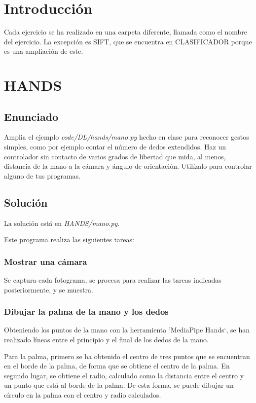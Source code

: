 \documentclass[12pt]{article}
\begin{document}

\tableofcontents
\pagebreak

\listoffigures
\pagebreak

\section*{Introducción}
Cada ejercicio se ha realizado en una carpeta diferente, llamada como el nombre del ejercicio. La excepción es SIFT, que se encuentra en CLASIFICADOR porque es una ampliación de este.

\section{HANDS} \label{sec:hands}
\subsection*{Enunciado}
Amplia el ejemplo \textit{code/DL/hands/mano.py} hecho en clase para reconocer gestos simples, como por ejemplo contar el número de dedos extendidos. Haz un controlador sin contacto de varios grados de libertad que mida, al menos, distancia de la mano a la cámara y ángulo de orientación. Utilízalo para controlar alguno de tus programas.

\subsection*{Solución}
La solución está en \textit{HANDS/mano.py}.

Este programa realiza las siguientes tareas:
\subsubsection*{Mostrar una cámara}
Se captura cada fotograma, se procesa para realizar las tareas indicadas posteriormente, y se muestra.

\subsubsection*{Dibujar la palma de la mano y los dedos}

Obteniendo los puntos de la mano con la herramienta 'MediaPipe Hands`, se han realizado líneas entre el principio y el final de los dedos de la mano. 

Para la palma, primero se ha obtenido el centro de tres puntos que se encuentran en el borde de la palma, de forma que se obtiene el centro de la palma. En segundo lugar, se obtiene el radio, calculado como la distancia entre el centro y un punto que está al borde de la palma. De esta forma, se puede dibujar un círculo en la palma con el centro y radio calculados.
\end{document}
